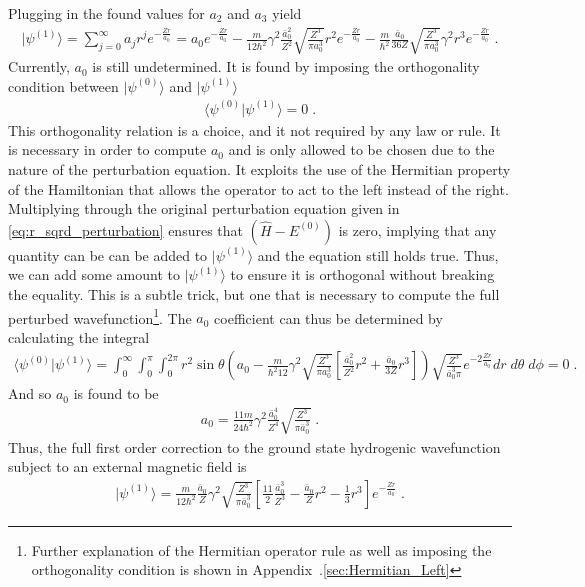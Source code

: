         \noindent Plugging in the found values for $a_2$ and $a_3$ yield 
        \begin{align}
            \vert \psi^{(1)} \rangle = \sum_{j = 0}^\infty a_j r^j e^{-\frac{Zr}{a_0}} = a_0 e^{-\frac{Zr}{a_0}} -\frac{m}{12\hbar^2} \gamma^2 \frac{\bar{a}_0^2}{Z^2} \sqrt{\frac{Z^3}{\pi a_0^3}} r^2 e^{-\frac{Zr}{a_0}} -\frac{m}{\hbar^2}\frac{\bar{a}_0}{36Z}\sqrt{\frac{Z^3}{\pi a_0^3}} \gamma^2 r^3 e^{-\frac{Zr}{a_0}}\;.
        \end{align}
        Currently, $a_0$ is still undetermined. It is found by imposing the orthogonality condition between $\vert \psi^{(0)} \rangle$ and $\vert \psi^{(1)} \rangle$
        \begin{align}
            \langle \psi^{(0)} \vert \psi^{(1)} \rangle = 0\;.
        \end{align}
        This orthogonality relation is a choice, and it not required by any law or rule. It is necessary in order to compute $a_0$ and is only allowed to be chosen due to the nature of the perturbation equation. It exploits the use of the Hermitian property of the Hamiltonian that allows the operator to act to the left instead of the right. Multiplying through the original perturbation equation given in \eqref{eq:r_sqrd_perturbation} ensures that $\left(\hat{H} - E^{(0)} \right)$ is zero, implying that any quantity can be can be added to $\vert \psi^{(1)}\rangle$ and the equation still holds true. Thus, we can add some amount to $\vert \psi^{(1)} \rangle$ to ensure it is orthogonal without breaking the equality. This is a subtle trick, but one that is necessary to compute the full perturbed wavefunction\footnote{Further explanation of the Hermitian operator rule as well as imposing the orthogonality condition is shown in Appendix~.\ref{sec:Hermitian_Left}}. The $a_0$ coefficient can thus be determined by calculating the integral 
        \small
        \begin{align}
            \langle \psi^{(0)} \vert \psi^{(1)} \rangle = \int_0^\infty \int_0^\pi \int_0^{2\pi} r^2 \sin \theta \left(a_0 -\frac{m}{\hbar^2 12} \gamma^2 \sqrt{\frac{Z^3}{\pi a_0^3}} \left[\frac{\bar{a}_0^2}{Z^2} r^2 +\frac{\bar{a}_0}{3Z} r^3\right] \right) \sqrt{\frac{Z^3}{\bar{a}_0^3 \pi}}e^{-2\frac{Zr}{\bar{a}_0}}dr\;d\theta\; d\phi = 0\;.
        \end{align}
        \normalsize
        \noindent And so $a_0$ is found to be 
        \begin{align}
            a_0 = \frac{11m}{24 \hbar^2} \gamma^2 \frac{\bar{a}_0^4}{Z^4}\sqrt{\frac{Z^3}{\pi \bar{a}_0^3}} \;.
        \end{align}
        \noindent Thus, the full first order correction to the ground state hydrogenic wavefunction subject to an external magnetic field is 
        \begin{align}
            \vert \psi^{(1)} \rangle = \frac{m}{12 \hbar^2}\frac{\bar{a}_0}{Z}\gamma^2 \sqrt{\frac{Z^3}{\pi \bar{a}_0^3}} \left[\frac{11}{2}\frac{\bar{a}_0^3}{Z^3} - \frac{\bar{a}_0}{Z} r^2 -\frac{1}{3} r^3 \right] e^{-\frac{Zr}{a_0}} \;. \label{psi_1_result}
        \end{align}
